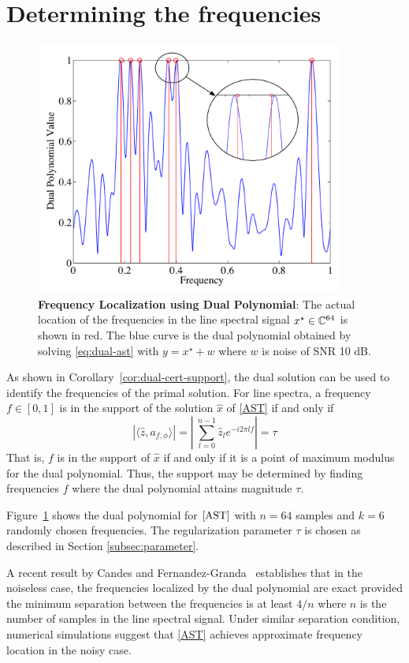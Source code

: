 \section{Determining the frequencies}
\label{sec:frequency-localize}
\begin{figure}[htp]
\centering
\includegraphics[width=4in]{figures/dual_poly_inset.pdf}
\caption{ \textbf{Frequency Localization using Dual Polynomial}: The
actual location of the frequencies in the line spectral signal $x^\star \in
\mathbb{C}^{64}$ is shown in red. The blue curve is the dual polynomial
obtained by solving \eqref{eq:dual-ast} with $y = x^\star + w$ where $w$ is noise of SNR 10 dB.}

\label{fig:dual_poly_localize}
\end{figure}

As shown in Corollary~\ref{cor:dual-cert-support}, the dual solution can be
used to identify the frequencies of the primal solution. For line spectra, a frequency
$f \in [0,1]$ is in the support of the solution $\hat{x}$ of \eqref{AST} if and
only if
\[
	 |\langle \hat{z}, a_{f,\phi} \rangle| =\left|\ \sum_{l=0}^{n-1} \hat{z}_l e^{-i 2\pi l f} \right| = \tau
\]
That is, $f$ is in the support of $\hat{x}$ if and only if it is a point of maximum modulus for the dual polynomial. Thus, the support
may be determined by finding frequencies $f$ where the dual polynomial attains magnitude $\tau$. 

Figure~\ref{fig:dual_poly_localize} shows the dual
polynomial for $\eqref{AST}$ with $n = 64$ samples and $k = 6$
 randomly chosen frequencies. The regularization
parameter $\tau$ is chosen as described in Section \ref{subsec:parameter}.

A recent result by Candes and Fernandez-Granda~\cite{CandesGranda} establishes
that in the noiseless case, the frequencies localized by the dual polynomial
are exact provided the minimum separation between the frequencies is at least
$4/n$ where $n$ is the number of samples in the line spectral signal. Under similar separation condition, numerical simulations suggest that \eqref{AST} achieves approximate frequency location in the noisy case. 

